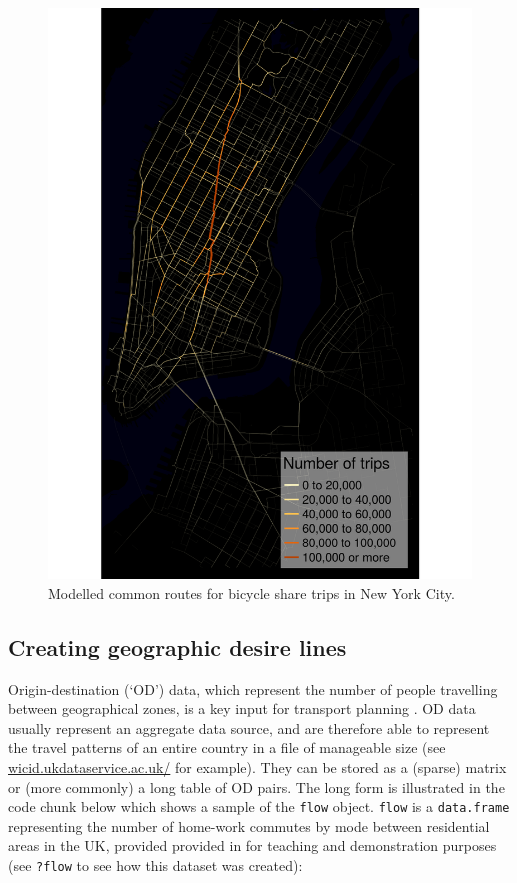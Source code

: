 \begin{figure}

{\centering \includegraphics[width=0.55\linewidth]{nyc-bicycle-data}

}

\caption{Modelled common routes for bicycle share trips in New York City.}\label{fig:nyc-bicycle-data}
\end{figure}

\subsection{Creating geographic desire
lines}\label{creating-geographic-desire-lines}

Origin-destination (`OD') data, which represent the number of people travelling between
geographical zones, is a key input for transport planning \citep{calabrese_estimating_2011}.
OD data usually represent an aggregate data source, and are therefore able to represent the
travel patterns of an entire country in a file of manageable size
(see \href{http://wicid.ukdataservice.ac.uk/}{wicid.ukdataservice.ac.uk/} for example).
They can be stored as a (sparse) matrix or (more commonly) a long table of OD pairs.
The long form is illustrated in the code chunk below which shows a sample of
the \texttt{flow} object.
\texttt{flow} is a \texttt{data.frame} representing the number
of home-work commutes by mode between residential
areas in the UK, provided provided in 
for teaching and demonstration purposes
(see \texttt{?flow} to see how this dataset was created):

